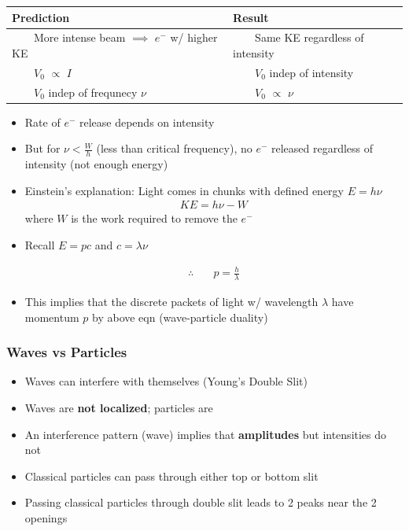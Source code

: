 \documentclass[a4paper,12pt]{article}
\newcommand{\tabitem}{~~\llap{\textbullet}~~}
\begin{document}
\begin{center}
  \begin{tabular}{|l|l|}
   \hline
   Prediction & Result \\
   \hline
   \tabitem More intense beam $\implies$ $e^{-}$ w/ higher KE & \tabitem  Same KE regardless of intensity\\

   \tabitem  $V_0$ $\propto$ $I$ & \tabitem $V_0$ indep of intensity\\

   \tabitem $V_0$ indep of frequnecy $\nu$ & \tabitem  $V_0$ $\propto$ $\nu$\\

   \hline
  \end{tabular}
\end{center}

\begin{itemize}
  \item Rate of $e^{-}$ release depends on intensity
  \item But for $\nu < \frac{W}{h}$ (less than critical frequency), no $e^{-}$ released regardless of intensity (not enough energy)
  \item Einstein's explanation: Light comes in chunks with defined energy $E = h\nu$
  \begin{align}
    KE = h\nu -W
  \end{align}
  where $W$ is the work required to remove the $e^{-}$
  \item Recall $E = pc$  and $c = \lambda\nu$

  \begin{align}
    \therefore{}\quad &p = \frac{h}{\lambda}
  \end{align}

  \item This implies that the discrete packets of light w/ wavelength $\lambda$ have momentum $p$ by above eqn (wave-particle duality)
\end{itemize}

\subsubsection{Waves vs Particles}
\begin{itemize}
  \item Waves can interfere with themselves (Young's Double Slit)
  \item Waves are \textbf{not localized}; particles are
  \item An interference pattern (wave) implies that \textbf{amplitudes} but intensities do not
  \item Classical particles can pass through either top or bottom slit
  \item Passing classical particles through double slit leads to 2 peaks near the 2 openings
\end{itemize}
\end{document}
